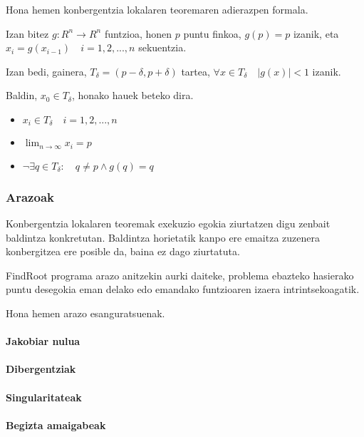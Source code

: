 \documentclass[10pt,a4paper,basque]{article}
\begin{document}
Hona hemen konbergentzia lokalaren teoremaren adierazpen formala.

Izan bitez $g:R^n \rightarrow R^n$ funtzioa, honen $p$ puntu finkoa, $g(p) = p$ izanik, eta $x_i = g(x_{i-1}) \quad i = 1, 2, ..., n$ sekuentzia.

Izan bedi, gainera, $T_{\delta} = (p - \delta, p + \delta)$ tartea, $\forall x \in T_{\delta} \quad |g(x)| < 1$ izanik.

Baldin, $x_0 \in T_{\delta}$, honako hauek beteko dira.

\begin{itemize}
\item $x_i \in T_{\delta} \quad i = 1, 2, ..., n$
\item $\lim_{n \rightarrow \infty} x_i = p$
\item $\neg\exists q \in T_{\delta} : \quad q \neq p \wedge g(q) = q$
\end{itemize}

\subsubsection{Arazoak}

Konbergentzia lokalaren teoremak exekuzio egokia ziurtatzen digu zenbait baldintza konkretutan. Baldintza horietatik kanpo ere emaitza zuzenera konbergitzea ere posible da, baina ez dago ziurtatuta.

FindRoot programa arazo anitzekin aurki daiteke, problema ebazteko hasierako puntu desegokia eman delako edo emandako funtzioaren izaera intrintsekoagatik.

Hona hemen arazo esanguratsuenak.

\paragraph{Jakobiar nulua}

\paragraph{Dibergentziak}

\paragraph{Singularitateak}

\paragraph{Begizta amaigabeak}
\end{document}
